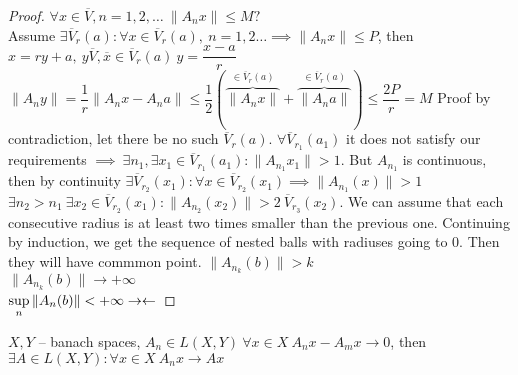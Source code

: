 \begin{proof}
  $\forall x \in \overline{V}, n = 1,2, \dots\ \|A_nx\| \leq M?$ \\
  Assume $\exists \overline{V}_r(a) : \forall x \in \overline{V}_r(a),\ n = 1,2 \dots \implies
  \|A_nx\| \leq P$, then \\
  $x = r y + a,\ y \overline{V}, \overline{x} \in \overline{V}_r(a)\ y = \dfrac{x - a}{r}$ \\
  $\|A_ny\| = \dfrac 1r \|A_nx - A_na\| \leq \dfrac 12 (\overbrace{\|A_nx\|}^{\in
    \overline{V}_r(a)} + \overbrace{\|A_na\|}^{\in \overline{V}_r(a)}) \leq \dfrac{2P}{r} = M$
  Proof by contradiction, let there be no such $\overline{V}_r(a)$.
  $\forall \overline{V}_{r_1}(a_1)$ it does not satisfy our requirements $\implies\
  \exists n_1, \exists x_1 \in \overline{V}_{r_1}(a_1): \|A_{n_1}x_1\| > 1$. But
  $A_{n_1}$ is continuous, then by continuity $\exists \overline{V}_{r_2}(x_1): \forall
  x \in \overline{V}_{r_2}(x_1) \implies \|A_{n_1}(x)\| > 1$ \\
  $\exists n_2 > n_1\ \exists x_2 \in \overline{V}_{r_2}(x_1): \|A_{n_2}(x_2)\| > 2\
  \overline{V}_{r_3}(x_2)$.
  We can assume that each consecutive radius is at least two times smaller than
  the previous one. Continuing by induction, we get the sequence of nested balls
  with radiuses going to 0. Then they will have commmon point. 
  $\|A_{n_k}(b)\| > k$  \\
  $\|A_{n_k}(b)\| \to +\infty$ \\
  $\sup\limits_n \|A_n(b)\| < +\infty \rightarrow\leftarrow$
\end{proof}

\begin{cor}
  $X, Y$ -- banach spaces, $A_n \in L(X, Y)\ \forall x \in X\ A_n x - A_mx \to
  0$, then $\exists A \in L(X, Y): \forall x \in X\ A_nx \to Ax$
\end{cor}